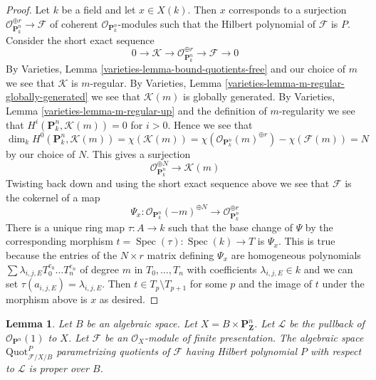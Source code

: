 \documentclass{stacks-project}
\theoremstyle{plain}
\newtheorem{lemma}[subsection]{Lemma}
\theoremstyle{definition}
\theoremstyle{remark}
\numberwithin{equation}{subsection}
\def\Spec{\mathop{\mathrm{Spec}}}
\def\Quotfunctor{\mathrm{Quot}}
\begin{document}
\begin{proof}
\medskip\noindent
Let $k$ be a field and let $x \in X(k)$. Then $x$ corresponds to
a surjection $\mathcal{O}_{\mathbf{P}^n_k}^{\oplus r} \to \mathcal{F}$
of coherent $\mathcal{O}_{\mathbf{P}^n_k}$-modules
such that the Hilbert polynomial of $\mathcal{F}$ is $P$.
Consider the short exact sequence
$$
0 \to \mathcal{K} \to
\mathcal{O}_{\mathbf{P}^n_k}^{\oplus r} \to
\mathcal{F} \to 0
$$
By Varieties, Lemma \ref{varieties-lemma-bound-quotients-free}
and our choice of $m$ we see that $\mathcal{K}$ is $m$-regular.
By Varieties, Lemma \ref{varieties-lemma-m-regular-globally-generated}
we see that $\mathcal{K}(m)$ is globally generated.
By Varieties, Lemma \ref{varieties-lemma-m-regular-up}
and the definition of $m$-regularity we see that
$H^i(\mathbf{P}^n_k, \mathcal{K}(m)) = 0$ for $i > 0$.
Hence we see that
$$
\dim_k H^0(\mathbf{P}^n_k, \mathcal{K}(m)) =
\chi(\mathcal{K}(m)) =
\chi(\mathcal{O}_{\mathbf{P}^n_k}(m)^{\oplus r}) -
\chi(\mathcal{F}(m)) = N
$$
by our choice of $N$. This gives a surjection
$$
\mathcal{O}_{\mathbf{P}^n_k}^{\oplus N}
\longrightarrow
\mathcal{K}(m)
$$
Twisting back down and using the short exact sequence above
we see that $\mathcal{F}$ is the cokernel of a map
$$
\Psi_x :
\mathcal{O}_{\mathbf{P}^n_k}(-m)^{\oplus N}
\to
\mathcal{O}_{\mathbf{P}^n_k}^{\oplus r}
$$
There is a unique ring map $\tau : A \to k$ such that the base change
of $\Psi$ by the corresponding morphism $t = \Spec(\tau) : \Spec(k) \to T$
is $\Psi_x$. This is true because the entries of the $N \times r$
matrix defining $\Psi_x$ are homogeneous polynomials
$\sum \lambda_{i, j, E} T_0^{e_0} \ldots T_n^{e_n}$
of degree $m$ in $T_0, \ldots, T_n$ with coefficients
$\lambda_{i, j, E} \in k$ and we can set
$\tau(a_{i, j, E}) = \lambda_{i, j, E}$.
Then $t \in T_p \setminus T_{p + 1}$ for some $p$ and
the image of $t$ under the morphism above is $x$ as desired.
\end{proof}

\begin{lemma}
\label{lemma-quot-Pn-over-base}
Let $B$ be an algebraic space. Let $X = B \times \mathbf{P}^n_\mathbf{Z}$.
Let $\mathcal{L}$ be the pullback of $\mathcal{O}_{\mathbf{P}^n}(1)$ to $X$.
Let $\mathcal{F}$ be an $\mathcal{O}_X$-module of finite
presentation. The algebraic space $\Quotfunctor^P_{\mathcal{F}/X/B}$
parametrizing quotients of $\mathcal{F}$
having Hilbert polynomial $P$ with respect to $\mathcal{L}$
is proper over $B$.
\end{lemma}
\end{document}
